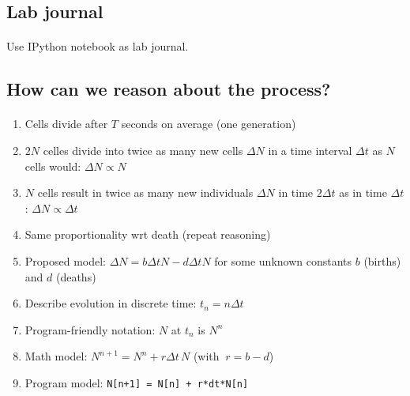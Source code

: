 \documentclass[%
twoside,                 %
final,                   %
10pt]{article}
\begin{document}
\subsection{Lab journal}


\paragraph{}
Use IPython notebook as lab journal.




\subsection{How can we reason about the process?}



\paragraph{}
\begin{enumerate}
\item Cells divide after $T$ seconds on average (one generation)

\item $2N$ celles divide into twice as many new cells $\Delta N$ in a time
   interval $\Delta t$ as $N$ cells would: $\Delta N \propto N$

\item $N$ cells result in twice as many new individuals $\Delta N$ in
   time $2\Delta t$ as in time $\Delta t$: $\Delta N \propto\Delta t$

\item Same proportionality wrt death (repeat reasoning)

\item Proposed model: $\Delta N = b\Delta t N - d\Delta tN$ for some unknown
   constants $b$ (births) and $d$ (deaths)

\item Describe evolution in discrete time: $t_n=n\Delta t$

\item Program-friendly notation: $N$ at $t_n$ is $N^n$

\item Math model: $N^{n+1} = N^n + r\Delta t\, N$ (with $\ r=b-d$)

\item Program model: \Verb!N[n+1] = N[n] + r*dt*N[n]!
\end{enumerate}
\end{document}
